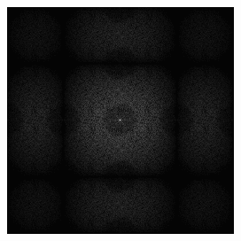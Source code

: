 \begin{figure}[H]
\begin{tcolorbox}[boxrule=4pt,sharp corners=downhill,title=Sortieren]
\begin{subfigure}[b]{0.2\textwidth}
        \label{pic:sorting_t5}
    \end{subfigure}
    \begin{subfigure}[b]{0.2\textwidth}
        \centering
        \includegraphics[width=\textwidth]{content/TemporalerAlg/Bilder/Sorting/Spektren/Ausschnitt5.png}
        \label{pic:sorting_t5_FFT}
    \end{subfigure}
    \begin{subfigure}[b]{0.2\textwidth}
        \centering

\end{subfigure}
\end{tcolorbox}
\end{figure}
